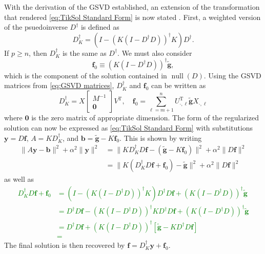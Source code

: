 \documentclass[12pt]{book}
\newcommand{\gnoiseVec}{\widetilde{\mathbf{g}}}	%
\newcommand{\kMat}{K}	%
\newcommand{\fVec}{\mathbf{f}}	%
\newcommand{\trans}{\mathrm{T}}	%
\DeclareMathOperator{\nullspace}{null}	%
\newcommand{\regparam}{\alpha}
\newcommand{\Todo}[1]{\textcolor{green}{\textbf{#1}}}
\begin{document}
With the derivation of the GSVD established, an extension of the transformation that rendered \eqref{eq:TikSol Standard Form} is now stated \cite[p.~38]{Hansen:98}. First, a weighted version of the psuedoinverse $D^\dagger$ is defined as
\[D_{\kMat}^\dagger = \left(I - \left(\kMat\left(I - D^\dagger D\right)\right)^\dagger \kMat\right)D^\dagger.\]
If $p \geq n$, then $D_{\kMat}^\dagger$ is the same as $D^\dagger$. We must also consider
\[\fVec_0 \equiv \left(\kMat\left(I - D^\dagger D\right)\right)^\dagger \gnoiseVec,\]
which is the component of the solution contained in $\nullspace(D)$.  Using the GSVD matrices from \eqref{eq:GSVD matrices}, $D_{\kMat}^\dagger$ and $\fVec_0$ can be written as
\begin{equation}
\label{eq:Trans. 1}
D_{\kMat}^\dagger = X \begin{bmatrix}
M^{-1} \\
\mathbf{0}
\end{bmatrix}V^\trans, \quad \fVec_0 = \sum_{\ell=m+1}^{n} U_{\cdot,\ell}^\trans\gnoiseVec X_{\cdot,\ell}
\end{equation}
where $\bm{0}$ is the zero matrix of appropriate dimension. The form of the regularized solution can now be expressed as \eqref{eq:TikSol Standard Form} with substitutions $\mathbf{y} = D\fVec$, $A = \kMat{D_{\kMat}^\dagger}$, and $\mathbf{b} = \gnoiseVec - \kMat\fVec_0$. This is shown by writing
\begin{align*}
\|A\mathbf{y} - \mathbf{b}\|^2 + \regparam^2\|\mathbf{y}\|^2 &= \|\kMat{D_{\kMat}^\dagger}D\fVec - (\gnoiseVec - \kMat\fVec_0)\|^2 + \regparam^2\|D\fVec\|^2 \\
&=  \|\kMat({D_{\kMat}^\dagger}D\fVec + \fVec_0) - \gnoiseVec\|^2 + \regparam^2\|D\fVec\|^2
\end{align*}
as well as 
\Todo{
\begin{align*}
{D_{\kMat}^\dagger}D\fVec + \fVec_0 &= \left(I - \left(\kMat\left(I - D^\dagger D\right)\right)^\dagger \kMat\right)D^\dagger D\fVec + \left(\kMat\left(I - D^\dagger D\right)\right)^\dagger \gnoiseVec \\
&= D^\dagger D\fVec - \left(\kMat\left(I - D^\dagger D\right)\right)^\dagger \kMat D^\dagger D\fVec + \left(\kMat\left(I - D^\dagger D\right)\right)^\dagger \gnoiseVec \\ 
&= D^\dagger D\fVec + \left(\kMat\left(I - D^\dagger D\right)\right)^\dagger \left[\gnoiseVec - \kMat D^\dagger D\fVec\right] \\
&= 
\end{align*}}
The final solution is then recovered by $\fVec = D_{\kMat}^\dagger \mathbf{y} + \fVec_0$. 
\end{document}
